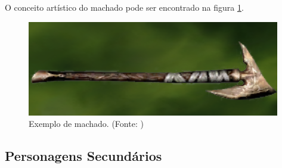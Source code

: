 \begin{itemize}
O conceito artístico do machado pode ser encontrado na figura 
\ref{img:machado}.

\begin{figure}[H]
 \centering
 \includegraphics[scale=1]{Imagens/machado01.png}
 \caption{Exemplo de machado. (Fonte: \cite{bib:jogoinfinity})}
\label{img:machado}
\end{figure}

\end{itemize}

\subsection{Personagens Secundários}
